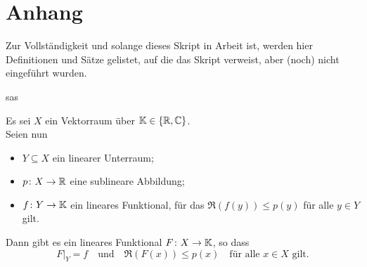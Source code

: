 

\chapter*{Anhang}  

Zur Vollständigkeit und solange dieses Skript in Arbeit ist, werden hier Definitionen und Sätze gelistet, auf die das Skript verweist, aber (noch) nicht eingeführt wurden.


\begin{satz*}[Lebesgue]  \label{satz:x-Satz von Lebesgue}

	sas	
\end{satz*}


\begin{satznbfr}  \label{satz:x-hahn-banach}
	Es sei $X$ ein Vektorraum über $\mathbb{K} \in \{ \mathbb{R}, \mathbb{C} \}$. \\
	Seien nun
	\begin{itemize}
		\item $Y \subseteq X$ ein linearer Unterraum;
		\item $p \colon X \rightarrow \mathbb{R}$ eine sublineare Abbildung;
		\item $f \colon Y \rightarrow \mathbb{K}$ ein lineares Funktional, für das $\Re(f(y)) \leq p(y)$ für alle $y \in Y$ gilt.
	\end{itemize}
	Dann gibt es ein lineares Funktional $F \colon X \rightarrow \mathbb{K}$, so dass
	\[ F|_{Y} = f \quad \text{und} \quad \Re(F(x)) \leq p(x) \quad \text{für alle } x \in X \text{ gilt.} \]
\end{satznbfr}



\newpage